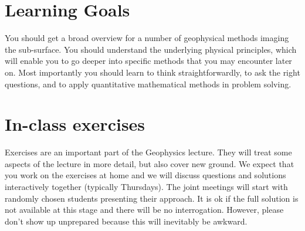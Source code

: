 \documentclass[letterpaper]{inzane_syllabus} %
\begin{document}

\section{Learning Goals}

You should get a broad overview for a number of geophysical methods imaging the sub-surface. You should understand the underlying physical principles, which will enable you to go deeper into specific methods that you may encounter later on. Most importantly you should learn to think straightforwardly, to ask the right questions, and to apply quantitative mathematical methods in problem solving.
    
\section{In-class exercises}

Exercises are an important part of the Geophysics lecture. They will treat some aspects of the lecture in more detail, but also cover new ground. We expect that you work on the exercises at home and we will discuss questions and solutions interactively together (typically Thursdays). The joint meetings will start with randomly chosen students presenting their approach. It is ok if the full solution is not available at this stage and there will be no interrogation. However, please don't show up unprepared because this will inevitably be awkward. 
\end{document}
